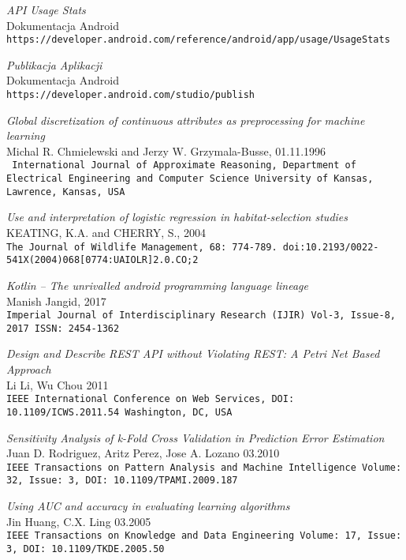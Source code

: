 \begin{thebibliography}{20}
\textit{API Usage Stats}
\\Dokumentacja Android
\\\texttt{https://developer.android.com/reference/android/app/usage/UsageStats}

\textit{Publikacja Aplikacji}
\\Dokumentacja Android
\\\texttt{https://developer.android.com/studio/publish}

\textit{Global discretization of continuous attributes as preprocessing for machine learning}
\\Michal R. Chmielewski and Jerzy W. Grzymala-Busse, 01.11.1996
\\\texttt{
International Journal of Approximate Reasoning, Department of Electrical Engineering and Computer Science University of Kansas, Lawrence, Kansas, USA
}

\textit{Use and interpretation of logistic regression in habitat‐selection studies}
\\KEATING, K.A. and CHERRY, S., 2004
\\\texttt{The Journal of Wildlife Management, 68: 774-789. doi:10.2193/0022-541X(2004)068[0774:UAIOLR]2.0.CO;2 }

\textit{Kotlin – The unrivalled android
programming language lineage}
\\Manish Jangid, 2017
\\\texttt{Imperial Journal of Interdisciplinary Research (IJIR) Vol-3, Issue-8, 2017 ISSN: 2454-1362}

\textit{Design and Describe REST API without Violating REST: A Petri Net Based Approach}
\\Li Li, Wu Chou 2011
\\\texttt{IEEE International Conference on Web Services, DOI: 10.1109/ICWS.2011.54 Washington, DC, USA}

\textit{Sensitivity Analysis of k-Fold Cross Validation in Prediction Error Estimation}
\\Juan D. Rodriguez, Aritz Perez, Jose A. Lozano 03.2010
\\\texttt{IEEE Transactions on Pattern Analysis and Machine Intelligence Volume: 32, Issue: 3, DOI: 10.1109/TPAMI.2009.187}

\textit{Using AUC and accuracy in evaluating learning algorithms}
\\Jin Huang, C.X. Ling 03.2005
\\\texttt{IEEE Transactions on Knowledge and Data Engineering Volume: 17, Issue: 3, DOI: 10.1109/TKDE.2005.50}


\end{thebibliography}
